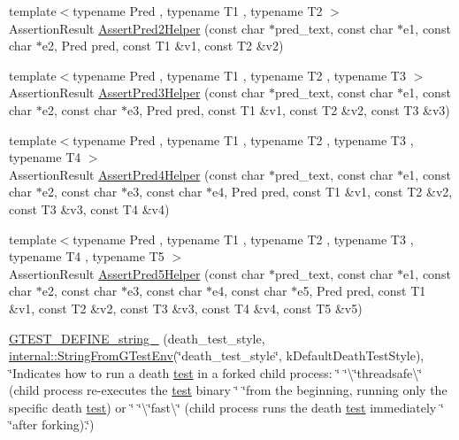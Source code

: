 \begin{DoxyCompactItemize}
\item 
{\footnotesize template$<$typename Pred , typename T1 , typename T2 $>$ }\\Assertion\+Result \mbox{\hyperlink{namespacetesting_aa6587938029dd8733ecb885068f08247}{Assert\+Pred2\+Helper}} (const char $\ast$pred\+\_\+text, const char $\ast$e1, const char $\ast$e2, Pred pred, const T1 \&v1, const T2 \&v2)
\item 
{\footnotesize template$<$typename Pred , typename T1 , typename T2 , typename T3 $>$ }\\Assertion\+Result \mbox{\hyperlink{namespacetesting_ac92dcbd00a0ffb2913e65d286e321a22}{Assert\+Pred3\+Helper}} (const char $\ast$pred\+\_\+text, const char $\ast$e1, const char $\ast$e2, const char $\ast$e3, Pred pred, const T1 \&v1, const T2 \&v2, const T3 \&v3)
\item 
{\footnotesize template$<$typename Pred , typename T1 , typename T2 , typename T3 , typename T4 $>$ }\\Assertion\+Result \mbox{\hyperlink{namespacetesting_ae90c778d69db4682e8fd8baaa0a9f9cd}{Assert\+Pred4\+Helper}} (const char $\ast$pred\+\_\+text, const char $\ast$e1, const char $\ast$e2, const char $\ast$e3, const char $\ast$e4, Pred pred, const T1 \&v1, const T2 \&v2, const T3 \&v3, const T4 \&v4)
\item 
{\footnotesize template$<$typename Pred , typename T1 , typename T2 , typename T3 , typename T4 , typename T5 $>$ }\\Assertion\+Result \mbox{\hyperlink{namespacetesting_addcf52b273ce17269cbf4956cfe600a6}{Assert\+Pred5\+Helper}} (const char $\ast$pred\+\_\+text, const char $\ast$e1, const char $\ast$e2, const char $\ast$e3, const char $\ast$e4, const char $\ast$e5, Pred pred, const T1 \&v1, const T2 \&v2, const T3 \&v3, const T4 \&v4, const T5 \&v5)
\item 
\mbox{\hyperlink{namespacetesting_a62d8ec1eb3e20f20ed52604b0dfa3425}{G\+T\+E\+S\+T\+\_\+\+D\+E\+F\+I\+N\+E\+\_\+string\+\_\+}} (death\+\_\+test\+\_\+style, \mbox{\hyperlink{namespacetesting_1_1internal_a7ed785df46a339403b0f749d3a879201}{internal\+::\+String\+From\+G\+Test\+Env}}(\char`\"{}death\+\_\+test\+\_\+style\char`\"{}, k\+Default\+Death\+Test\+Style), \char`\"{}Indicates how to run a death \mbox{\hyperlink{_mutual_8h_a707ee03719e99670bf6cfdfd897b8456}{test}} in a forked child process\+: \char`\"{} \char`\"{}\textbackslash{}\char`\"{}threadsafe\textbackslash{}\char`\"{} (child process re-\/executes the \mbox{\hyperlink{_mutual_8h_a707ee03719e99670bf6cfdfd897b8456}{test}} binary \char`\"{} \char`\"{}from the beginning, running only the specific death \mbox{\hyperlink{_mutual_8h_a707ee03719e99670bf6cfdfd897b8456}{test}}) or \char`\"{} \char`\"{}\textbackslash{}\char`\"{}fast\textbackslash{}\char`\"{} (child process runs the death \mbox{\hyperlink{_mutual_8h_a707ee03719e99670bf6cfdfd897b8456}{test}} immediately \char`\"{} \char`\"{}after forking).\char`\"{})

\end{DoxyCompactItemize}
